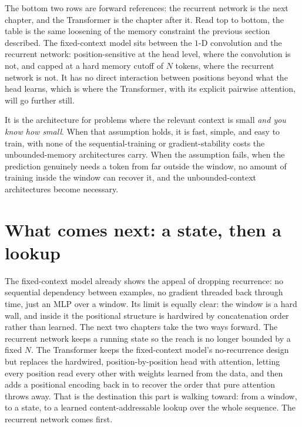 The bottom two rows are forward references: the recurrent network is the
next chapter, and the Transformer is the chapter after it. Read top to
bottom, the table is the same loosening of the memory constraint the
previous section described. The fixed-context model sits between the $1$-D
convolution and the recurrent network: position-sensitive at the head
level, where the convolution is not, and capped at a hard memory cutoff of
$N$ tokens, where the recurrent network is not. It has no direct
interaction between positions beyond what the head learns, which is where
the Transformer, with its explicit pairwise attention, will go further
still.

It is the architecture for problems where the relevant context is small
\emph{and you know how small}. When that assumption holds, it is fast,
simple, and easy to train, with none of the sequential-training or
gradient-stability costs the unbounded-memory architectures carry. When
the assumption fails, when the prediction genuinely needs a token from far
outside the window, no amount of training inside the window can recover it,
and the unbounded-context architectures become necessary.

\section{What comes next: a state, then a lookup}\label{sec:bengio-handoff}

The fixed-context model already shows the appeal of dropping recurrence:
no sequential dependency between examples, no gradient threaded back
through time, just an MLP over a window. Its limit is equally clear: the
window is a hard wall, and inside it the positional structure is hardwired
by concatenation order rather than learned. The next two chapters take the
two ways forward. The recurrent network keeps a running state so the reach
is no longer bounded by a fixed $N$. The Transformer keeps the
fixed-context model's no-recurrence design but replaces the hardwired,
position-by-position head with attention, letting every position read every
other with weights learned from the data, and then adds a positional
encoding back in to recover the order that pure attention throws away. That
is the destination this part is walking toward: from a window, to a state,
to a learned content-addressable lookup over the whole sequence. The
recurrent network comes first.
